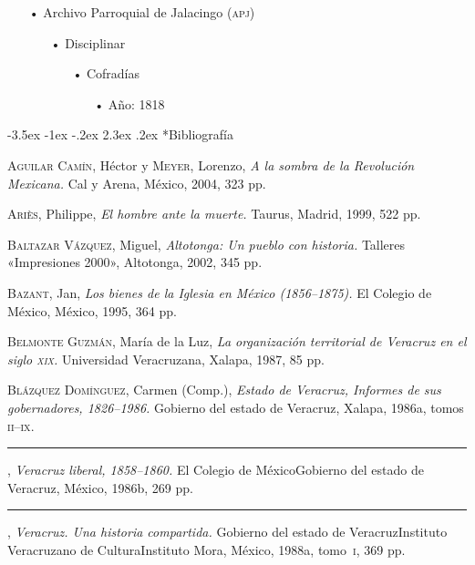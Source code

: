 \documentclass[14pt,twoside,final]{extbook} %
\makeatletter
\renewcommand\section{\@startsection {section}{1}{\z@}%
                                     {-3.5ex \@plus -1ex \@minus -.2ex}%
                                     {2.3ex \@plus .2ex}%
                                     {\normalfont\large\bfseries\sc}}
\makeatother
\begin{document}
\begin{itemize}[noitemsep]
\item[•]Archivo Parroquial de Jalacingo (\textsc{apj})
\begin{itemize}[noitemsep]
\item[•]Disciplinar
\begin{itemize}[noitemsep]
\item[•]Cofradías
\begin{itemize}[noitemsep]
\item[•]Año: 1818
\end{itemize}
\end{itemize}
\end{itemize}
\end{itemize}
\section*{Bibliografía}
\label{sec:bibliografia}
\textsc{Aguilar Camín}, Héctor y \textsc{Meyer}, Lorenzo, \emph{A la sombra de la Revolución Mexicana.} Cal y Arena, México, 2004, 323 pp.

\textsc{Ariès}, Philippe, \emph{El hombre ante la muerte.} Taurus, Madrid, 1999, 522 pp.

\textsc{Baltazar Vázquez}, Miguel, \emph{Altotonga: Un pueblo con historia.} Talleres «Impresiones 2000», Altotonga, 2002, 345 pp.

\textsc{Bazant}, Jan, \emph{Los bienes de la Iglesia en México (1856--1875).} El Colegio de México, México, 1995, 364 pp.

\textsc{Belmonte Guzmán}, María de la Luz, \emph{La organización territorial de Veracruz en el siglo \textsc{xix}.} Universidad Veracruzana, Xalapa, 1987, 85 pp.

\textsc{Blázquez Domínguez}, Carmen (Comp.), \emph{Estado de Veracruz, Informes de sus gobernadores, 1826--1986.} Gobierno del estado de Veracruz, Xalapa, 1986a, tomos \textsc{ii--ix}.

\rule{1cm}{0.4pt}, \emph{Veracruz liberal, 1858--1860.} El Colegio de México Gobierno del estado de Veracruz, México, 1986b, 269 pp.

\begin{sloppypar}
\rule{1cm}{0.4pt}, \emph{Veracruz. Una historia compartida.} Gobierno del estado de Veracruz Instituto Veracruzano de Cultura Instituto Mora, México, 1988a, tomo~\textsc{i}, 369 pp.
\end{sloppypar}%
\end{document}
